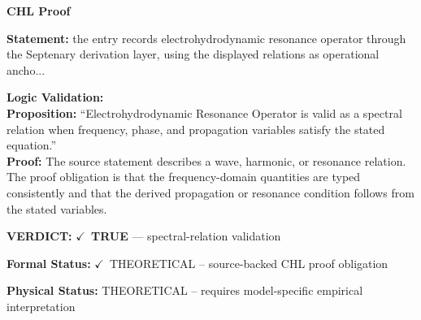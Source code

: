\vspace{0.45em}
\noindent\textbf{CHL Proof}\par
\textbf{Statement:} the entry records electrohydrodynamic resonance operator through the Septenary
derivation layer, using the displayed relations as operational ancho...

\textbf{Logic Validation:}\\
\textbf{Proposition:} ``Electrohydrodynamic Resonance Operator is valid as a spectral relation when frequency,
phase, and propagation variables satisfy the stated equation.''\\
\textbf{Proof:} The source statement describes a wave, harmonic, or resonance relation. The proof
obligation is that the frequency-domain quantities are typed consistently and that the
derived propagation or resonance condition follows from the stated variables.

\textbf{VERDICT:} \ensuremath{\checkmark}\ \textbf{TRUE} --- spectral-relation validation

\textbf{Formal Status:} \ensuremath{\checkmark}\ THEORETICAL -- source-backed CHL proof obligation

\textbf{Physical Status:} THEORETICAL -- requires model-specific empirical interpretation
\par\vspace{0.45em}
\par
\ifTZPDarkEdition
{}
\fi
\endgroup
\endgroup
